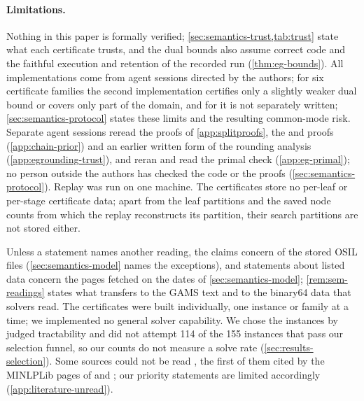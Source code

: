 \paragraph{Limitations.}\label{sec:conclusion-limits}
Nothing in this paper is formally verified; \cref{sec:semantics-trust,tab:trust} state what each certificate trusts, and the  dual bounds also assume correct code and the faithful execution and retention of the recorded run (\cref{thm:eg-bounds}).
All implementations come from agent sessions directed by the authors; for six certificate families the second implementation certifies only a slightly weaker dual bound or covers only part of the domain, and for  it is not separately written; \cref{sec:semantics-protocol} states these limits and the resulting common-mode risk.
Separate agent sessions reread the proofs of \cref{app:splitproofs}, the  and  proofs (\cref{app:chain-prior}) and an earlier written form of the  rounding analysis (\cref{app:egrounding-trust}), and reran and read the  primal check (\cref{app:eg-primal}); no person outside the authors has checked the code or the proofs (\cref{sec:semantics-protocol}).
Replay was run on one machine.
The  certificates store no per-leaf or per-stage certificate data; apart from the  leaf partitions and the saved node counts from which the  replay reconstructs its partition, their search partitions are not stored either.

Unless a statement names another reading, the claims concern  of the stored OSIL files (\cref{sec:semantics-model} names the exceptions), and statements about listed data concern the pages fetched on the dates of \cref{sec:semantics-model}; \cref{rem:sem-readings} states what transfers to the GAMS text and to the binary64 data that solvers read.
The certificates were built individually, one instance or family at a time; we implemented no general solver capability.
We chose the instances by judged tractability and did not attempt 114 of the 155 instances that pass our selection funnel, so our counts do not measure a solve rate (\cref{sec:results-selection}).
Some sources could not be read \citep{mcdonald1997-glopeq-a-new-computational-tool,huang2011-operative-planning-of-water-supply,ghaddar2015-a-lagrangian-decomposition-approach-for}, the first of them cited by the MINLPLib pages of  and ; our priority statements are limited accordingly (\cref{app:literature-unread}).


